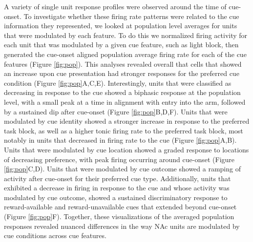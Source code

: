 \documentclass[11pt]{article}
\begin{document}
A variety of single unit response profiles were observed around the time of cue-onset. To investigate whether these firing rate patterns were related to the cue information they represented, we looked at population level averages for units that were modulated by each feature. To do this we normalized firing activity for each unit that was modulated by a given cue feature, such as light block, then generated the cue-onset aligned population average firing rate for each of the cue features (Figure \ref{fig:pop}). This analyses revealed overall that cells that showed an increase upon cue presentation had stronger responses for the preferred cue condition (Figure \ref{fig:pop}A,C,E). Interestingly, units that were classified as decreasing in response to the cue showed a biphasic response at the population level, with a small peak at a time in alignment with entry into the arm, followed by a sustained dip after cue-onset (Figure \ref{fig:pop}B,D,F). Units that were modulated by cue identity showed a stronger increase in response to the preferred task block, as well as a higher tonic firing rate to the preferred task block, most notably in units that decreased in firing rate to the cue (Figure \ref{fig:pop}A,B). Units that were modulated by cue location showed a graded response to locations of decreasing preference, with peak firing occurring around cue-onset (Figure \ref{fig:pop}C,D). Units that were modulated by cue outcome showed a ramping of activity after cue-onset for their preferred cue type. Additionally, units that exhibited a decrease in firing in response to the cue and whose activity was modulated by cue outcome, showed a sustained discriminatory response to reward-available and reward-unavailable cues that extended beyond cue-onset (Figure \ref{fig:pop}F). Together, these visualizations of the averaged population responses revealed nuanced differences in the way NAc units are modulated by cue conditions across cue features.  
\end{document}
